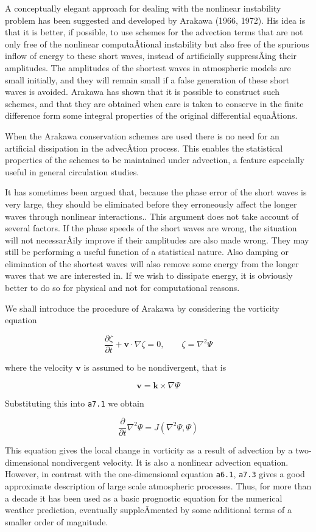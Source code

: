 A conceptually elegant approach for dealing with the nonlinear
instability problem has been suggested and developed by Arakawa (1966,
1972). His idea is that it is better, if possible, to use schemes for
the advection terms that are not only free of the nonlinear
computaÂ­tional instability but also free of the spurious inflow of
energy to these short waves, instead of artificially suppressÂ­ing their
amplitudes. The amplitudes of the shortest waves in atmospheric models
are small initially, and they will remain small if a false generation of
these short waves is avoided. Arakawa has shown that it is possible to
construct such schemes, and that they are obtained when care is taken to
conserve in the finite difference form some integral properties of the
original differential equaÂ­tions.

When the Arakawa conservation schemes are used there is no need for an
artificial dissipation in the advecÂ­tion process. This enables the
statistical properties of the schemes to be maintained under advection,
a feature especially useful in general circulation studies.

It has sometimes been argued that, because the phase error of the short
waves is very large, they should be eliminated before they erroneously
affect the longer waves through nonlinear interactions.. This argument
does not take account of several factors. If the phase speeds of the
short waves are wrong, the situation will not necessarÂ­ily improve if
their amplitudes are also made wrong. They may still be performing a
useful function of a statistical nature. Also damping or elimination of
the shortest waves will also remove some energy from the longer waves
that we are interested in. If we wish to dissipate energy, it is
obviously better to do so for physical and not for computational
reasons.

We shall introduce the procedure of Arakawa by considering the vorticity
equation

{\[\frac{\partial\zeta}{\partial t} + \textbf{v} \cdot\nabla\zeta = 0,\qquad \zeta = \nabla^{2}\Psi\]}

where the velocity \(\textbf{v}\) is assumed to be nondivergent, that is

{\[\textbf{v} = \textbf{k} \times \nabla\Psi\]}

Substituting this into \texttt{a7.1} we obtain

{\[\frac{\partial}{\partial t}\nabla^{2}\Psi = J\left( \nabla^2\Psi, \Psi \right)\]}

This equation gives the local change in vorticity as a result of
advection by a two-dimensional nondivergent velocity. It is also a
nonlinear advection equation. However, in contrast with the
one-dimensional equation \texttt{a6.1}, \texttt{a7.3} gives a good
approximate description of large scale atmospheric processes. Thus, for
more than a decade it has been used as a basic prognostic equation for
the numerical weather prediction, eventually suppleÂ­mented by some
additional terms of a smaller order of magnitude.


